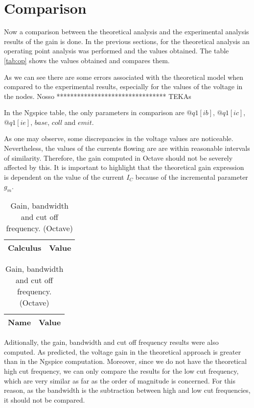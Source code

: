\section{Comparison}
\label{section:comparison}

\par Now a comparison between the theoretical analysis and the experimental analysis results of the gain is done. In the previous sections, for the theoretical analysis an operating point analysis was performed and the values obtained. The table \ref{tab:op} shows the values obtained and compares them.

\par As we can see there are some errors associated with the theoretical model when compared to the experimental results, especially for the values of the voltage in the nodes.
Nosso
********************************
TEKAs



In the Ngspice table, the only parameters in comparison are $@q1[ib]$, $@q1[ic]$, $@q1[ie]$, $base$, $coll$ and $emit$.
\par As one may observe, some discrepancies in the voltage values are noticeable. Nevertheless, the values of the currents flowing are are within reasonable intervals of similarity. Therefore, the gain computed in Octave should not be severely affected by this. It is important to highlight that the theoretical gain expression is dependent on the value of the current $I_{C}$ because of the incremental parameter $g_{m}$. 

 \begin{table}[h]
\parbox{.45\linewidth}{
  \centering
  \begin{tabular}{|l|r|}
    \hline    
    {\bf Calculus} & {\bf Value} \\ \hline
    
  \end{tabular}
  \caption{Gain, bandwidth and cut off frequency. (Ngspice)}} 
\parbox{.45\linewidth}{
 \centering
  \begin{tabular}{|l|r|}
    \hline    
    {\bf Name} & {\bf Value} \\ \hline
    
  \end{tabular}
  \caption{Gain, bandwidth and cut off frequency. (Octave)}}
\end{table}

\par Aditionally, the gain, bandwidth and cut off frequency results were also computed. As predicted, the voltage gain in the theoretical approach is greater than in the Ngspice computation. Moreover, since we do not have the theoretical high cut frequency, we can only compare the results for the low cut frequency, which are very similar as far as the order of magnitude is concerned. For this reason, as the bandwidth is the subtraction between high and low cut frequencies, it should not be compared.

